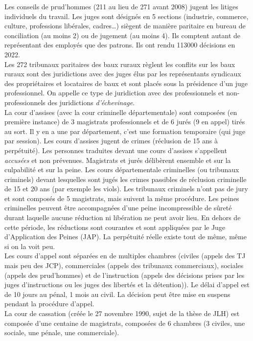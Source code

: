 \documentclass[math]{cours}
\begin{document}
Les conseils de prud'hommes (211 au lieu de 271 avant 2008) jugent les litiges individuels du travail.
Les juges sont désignés en 5 sections (industrie, commerce, culture, professions libérales, cadres\ldots) siègent de manière paritaire en bureau de conciliation (au moins 2) ou de jugement (au moins 4).
Ils comptent autant de représentant des employés que des patrons.
Ils ont rendu 113000 décisions en 2022.\\
Les 272 tribunaux paritaires des baux ruraux règlent les conflits sur les baux ruraux sont des juridictions avec des juges élus par les représentants syndicaux des propriétaires et locataires de baux et sont placés sous la présidence d'un juge professionnel.
On appelle ce type de juridiction avec des professionnels et non-professionnels des juridictions \emph{d'échevinage}.\\
La cour d'assises (avec la cour criminelle départementale) sont composées (en première instance) de 3 magistrats professionnels et de 6 jurés (9 en appel) tirés au sort.
Il y en a une par département, c'est une formation temporaire (qui juge par session).
Les cours d'assises jugent de crimes (réclusion de 15 ans à perpétuité).
Les personnes traduites devant une cours d'assises s'appellent \emph{accusées} et non prévenues.
Magistrats et jurés délibèrent ensemble et sur la culpabilité et sur la peine.
Les cours départementale criminelles (ou tribunaux criminels) devant lesquelles sont jugés les crimes passibles de réclusion criminelle de 15 et 20 ans (par exemple les viols).
Les tribunaux criminels n'ont pas de jury et sont composés de 5 magistrats, mais suivent la même procédure.
Les peines criminelles peuvent être accompagnées d'une peine incompressible de sûreté durant laquelle aucune réduction ni libération ne peut avoir lieu.
En dehors de cette période, les réductions sont courantes et sont appliquées par le Juge d'Application des Peines (JAP).
La perpétuité réelle existe tout de même, même si on la voit peu.\\
Les cours d'appel sont séparées en de multiples chambres (civiles (appels des TJ mais peu des JCP), commerciales (appels des tribunaux commerciaux), sociales (appels des prud'hommes) et de l'instruction (appels des décisions prises par les juges d'instructions ou les juges des libertés et la détention)).
Le délai d'appel est de 10 jours au pénal, 1 mois au civil.
La décision peut être mise en suspens pendant la procédure d'appel.\\
La cour de cassation (créée le 27 novembre 1990, sujet de la thèse de JLH) est composée d'une centaine de magistrats, composées de 6 chambres (3 civiles, une sociale, une pénale, une commerciale).
\end{document}
